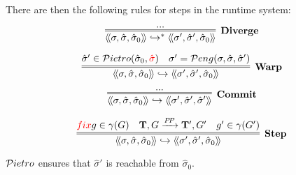 There are then the following rules for steps in the runtime system:

$$
\infer=[\text{\bf Diverge}]{
   \llangle \sigma,\hat{\sigma},\hat{\sigma}_0 \rrangle 
  \hookrightarrow^{*}
   \llangle \sigma',\hat{\sigma}',\hat{\sigma}_0 \rrangle 
}{ ... }
$$


$$
\infer=[\text{\bf Warp}]{
  \llangle \sigma,\hat{\sigma},\hat{\sigma}_0 \rrangle
  \hookrightarrow
  \llangle \sigma',\hat{\sigma}',\hat{\sigma}_0 \rrangle
}{
    \hat{\sigma}' \in \Pietrot(\hat{\sigma}_0,\red{\hat{\sigma}})
  & \sigma' = \Pengt(\sigma,\hat{\sigma},\hat{\sigma}')
}
$$

$$
\infer=[\text{\bf Commit}]{
  \llangle \sigma,\hat{\sigma},\hat{\sigma}_0 \rrangle
  \hookrightarrow
  \llangle \sigma',\hat{\sigma}',\hat{\sigma}' \rrangle
}{ ... }
$$

$$
\infer=[\text{\bf Step}]{
  \llangle \sigma,\hat{\sigma},\hat{\sigma}_0 \rrangle
  \hookrightarrow
  \llangle \sigma',\hat{\sigma}',\hat{\sigma}_0 \rrangle
}{
\red{fix}
  g \in \gamma(G)
& \Ts,G \xrightarrow{P\! P} \Ts',G'
& g' \in \gamma(G')}
$$

${\cal P}ietro$ ensures that $\hat{\sigma}'$ is reachable from $\hat{\sigma}_0$.

